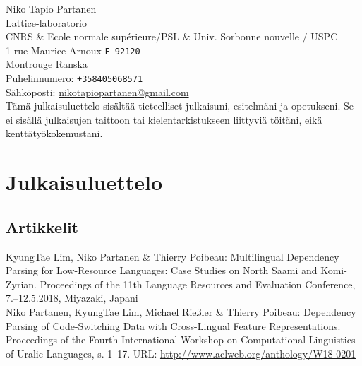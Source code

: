 \documentclass[11pt, a4paper]{article}
\newcommand{\years}[1]{\marginnote{\scriptsize #1}} %
\begin{document}

{\LARGE Niko Tapio Partanen}\\[1cm] %
Lattice-laboratorio\\
CNRS \& Ecole normale supérieure/PSL \& Univ. Sorbonne nouvelle / USPC\\
1 rue Maurice Arnoux \texttt{F-92120}\\
Montrouge Ranska\\[.2cm]
Puhelinnumero: \texttt{+358405068571}\\ %
Sähköposti: \href{mailto:nikotapiopartanen@gmail.com}{nikotapiopartanen@gmail.com}\\ %


Tämä julkaisuluettelo sisältää tieteelliset julkaisuni, esitelmäni ja opetukseni. Se ei sisällä julkaisujen taittoon tai kielentarkistukseen liittyviä töitäni, eikä kenttätyökokemustani.

\section*{Julkaisuluettelo}

\subsection*{Artikkelit}

\years{hyväksytty} KyungTae Lim, Niko Partanen \& Thierry Poibeau: Multilingual Dependency Parsing for Low-Resource Languages: Case Studies on North Saami and Komi-Zyrian. Proceedings of the 11th Language Resources and Evaluation Conference, 7.--12.5.2018, Miyazaki, Japani\\

\years{2018} Niko Partanen, KyungTae Lim, Michael Rießler \& Thierry Poibeau: Dependency Parsing of Code-Switching Data with Cross-Lingual Feature Representations. Proceedings of the Fourth International Workshop on Computational Linguistics of Uralic Languages, s. 1--17. URL: \url{http://www.aclweb.org/anthology/W18-0201}\\
\end{document}

